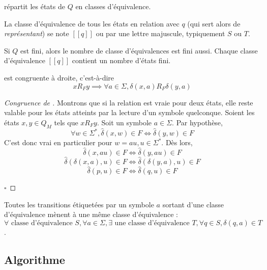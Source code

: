 \begin{corollary}
 \rf répartit les états de $Q$ en classes d'équivalence.
\end{corollary}

La classe d'équivalence de tous les états en relation \rf avec $q$ (qui sert alors de \emph{représentant}) se note $[[q]]$ ou par une lettre majuscule, typiquement $S$ ou $T$.

\begin{corollary}\label{col:qclasses}
  Si $Q$ est fini, alors le nombre de classe d'équivalences est fini aussi. Chaque classe d'équivalence $[[q]]$ contient un nombre d'états fini.
\end{corollary}

\begin{proposition}[Congruence de \rf]
 \rf est congruente à droite, c'est-à-dire $$xR_Fy \implies \forall a \in \Sigma, \delta(x,a)R_F\delta(y,a)$$
\end{proposition}

\begin{proof}[Congruence de \rf]\label{proof:rmcongruency}
 Montrons que si la relation est vraie pour deux états, elle reste valable pour les états atteints par la lecture d'un symbole quelconque. Soient les états $x,y \in Q_M$ tels que $xR_Fy$. Soit un symbole $a \in \Sigma$. Par hypothèse,
 $$\forall w \in \Sigma^*, \hat{\delta}(x, w) \in F \iff \hat{\delta}(y, w) \in F$$
 C'est donc vrai en particulier pour $w = au, u \in \Sigma^*$. Dès lors,
 $$\hat{\delta}(x, au) \in F\iff \hat{\delta}(y, au)\in F$$
 $$\hat{\delta}(\delta(x,a),u) \in F\iff\hat{\delta}(\delta(y,a),u)\in F$$
 $$\hat{\delta}(p,u) \in F\iff \hat{\delta}(q,u)\in F$$

\hfill$\square$
\end{proof}

\begin{corollary}\label{col:st}
 Toutes les transitions étiquetées par un symbole $a$ sortant d'une classe d'équivalence mènent à une même classe d'équivalence :
 $\forall\text{ classe d'équivalence }S,\forall a \in \Sigma, \exists\text{ une classe d'équivalence } T, \forall q \in S, \delta(q,a)\in T$.
\end{corollary}



\subsection{Algorithme}\label{ss:tfa}

